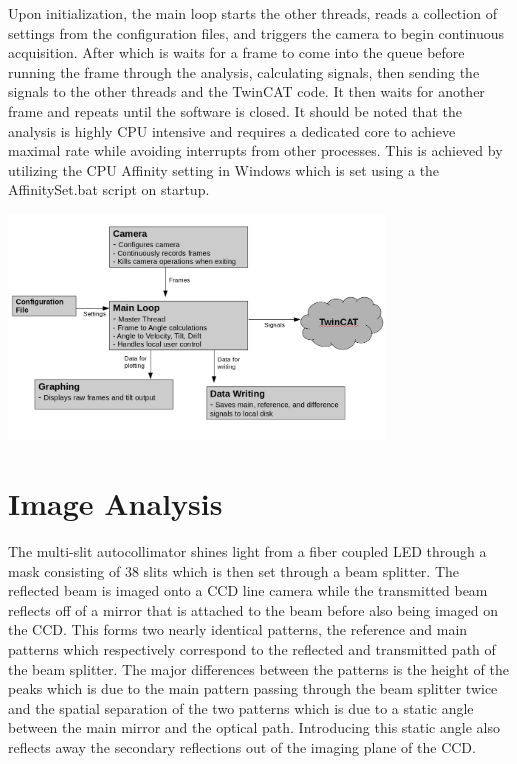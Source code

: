 \documentclass{article}
\begin{document}
Upon initialization, the main loop starts the other threads, reads a collection of settings from the configuration files, and triggers the camera to begin continuous acquisition. After which is waits for a frame to come into the queue before running the frame through the analysis, calculating signals, then sending the signals to the other threads and the TwinCAT code. It then waits for another frame and repeats until the software is closed. It should be noted that the analysis is highly CPU intensive and requires a dedicated core to achieve maximal rate while avoiding interrupts from other processes. This is achieved by utilizing the CPU Affinity setting in Windows which is set using a the AffinitySet.bat script on startup. 
\begin{center}
\includegraphics[width=0.75\textwidth]{BRSReadoutFlow.png}\\
\end{center}

\section{Image Analysis}
The multi-slit autocollimator shines light from a fiber coupled LED through a mask consisting of 38 slits which is then set through a beam splitter. The reflected beam is imaged onto a CCD line camera while the transmitted beam reflects off of a mirror that is attached to the beam before also being imaged on the CCD. This forms two nearly identical patterns, the reference and main patterns which respectively correspond to the reflected and transmitted path of the beam splitter. The major differences between the patterns is the height of the peaks which is due to the main pattern passing through the beam splitter twice and the spatial separation of the two patterns which is due to a static angle between the main mirror and the optical path. Introducing this static angle also reflects away the secondary reflections out of the imaging plane of the CCD.\\
\end{document}
